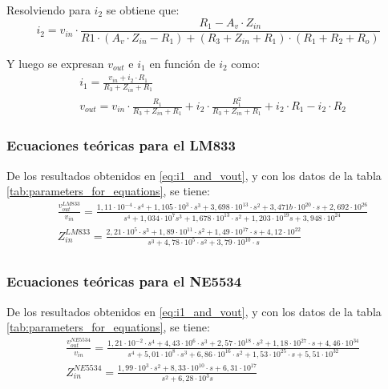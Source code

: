 Resolviendo para $i_2$ se obtiene que:
\begin{equation}
    i_2 = v_{in} \cdot \frac{R_1 - A_v \cdot Z_{in}}{R1 \cdot \left(A_v \cdot Z_{in} - R_1\right) + \left(R_3 + Z_{in} + R_1\right) \cdot \left(R_1 + R_2 + R_o\right)}
    \label{eq:i2}
\end{equation}

Y luego se expresan $v_{out}$ e $i_1$ en función de $i_2$ como:
\begin{align}
    \label{eq:i1_and_vout}
    &i_1 = \frac{v_{in} + i_2 \cdot R_1}{R_3 + Z_{in} + R_1} \\
    &v_{out} = v_{in} \cdot \frac{R_1}{R_3 + Z_{in} + R_1} + i_2 \cdot \frac{R_1^2}{R_3 + Z_{in} + R_1} + i_2 \cdot R_1 - i_2 \cdot R_2
\end{align}

\subsubsection{Ecuaciones teóricas para el LM833}
De los resultados obtenidos en \ref{eq:i1_and_vout}, y con los datos de la tabla \ref{tab:parameters_for_equations}, se tiene:
\begin{align}
    & \frac{v_{out}^{LM833}}{v_{in}} = \frac{1,11 \cdot 10^{-4} \cdot s^{4} + 1,105 \cdot 10^{3} \cdot s^{3} + 3,698 \cdot 10^{13} \cdot s^{2} + 3,471b\cdot 10^{20} \cdot s + 2,692 \cdot 10^{26}}
    {s^{4} + 1,034 \cdot 10^{7} s^{3} + 1,678 \cdot 10^{13} \cdot s^{2} + 1,203 \cdot 10^{19} s + 3,948 \cdot 10^{24}} \label{eq:LM833_transfer_fun} \\
    & Z_{in}^{LM833} = \frac{2,21 \cdot 10^{5} \cdot s^3 + 1,89 \cdot 10^{11} \cdot s^2 + 1,49 \cdot 10^{17} \cdot s + 4,12 \cdot 10^{22}}
    {s^3 + 4,78 \cdot 10^{5} \cdot s^2 + 3,79 \cdot 10^{10} \cdot s} \label{eq:LM833_in_impedance} \\
\end{align}

\subsubsection{Ecuaciones teóricas para el NE5534}
De los resultados obtenidos en \ref{eq:i1_and_vout}, y con los datos de la tabla \ref{tab:parameters_for_equations}, se tiene:
\begin{align}
    & \frac{v_{out}^{NE5534}}{v_{in}} = \frac{1,21 \cdot 10^{-2} \cdot s^4 + 4,43 \cdot 10^{6} \cdot s^3 + 2,57 \cdot 10^{18} \cdot s^2 + 1,18 \cdot 10^{27} \cdot s + 4,46 \cdot 10^{34}}
    {s^4 + 5,01 \cdot 10^{8} \cdot s^3 + 6,86 \cdot 10^{16} \cdot s^2 + 1,53 \cdot 10^{25} \cdot s + 5,51 \cdot 10^{32}} \label{eq:NE5534_transfer_fun} \\
    & Z_{in}^{NE5534} = \frac{1,99 \cdot 10^{3} \cdot s^2 + 8,33 \cdot 10^{10} \cdot s + 6,31 \cdot 10^{17}}
    {s^2 + 6,28 \cdot 10^{3} s} \label{eq:NE5534_in_impedance}
\end{align}


